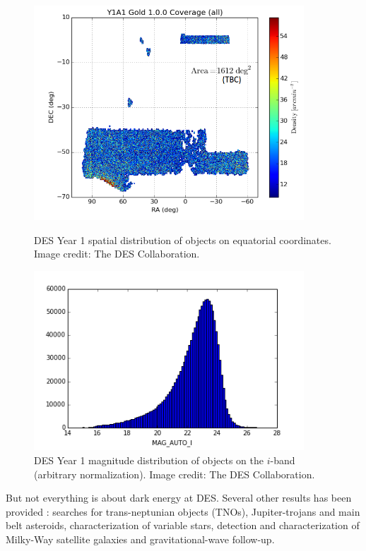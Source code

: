 \begin{figure}
\begin{center}
\includegraphics[width=0.9\textwidth]{./Pictures/des_y1_coverage.png}
\caption{DES Year 1 spatial distribution of objects on equatorial coordinates. Image credit: The DES Collaboration.}
\label{fig:des_y1_coverage}

\includegraphics[width=0.9\textwidth]{./Pictures/des_y1_mag_auto_i.png}
\caption{DES Year 1 magnitude distribution of objects on the $i$-band (arbitrary normalization). Image credit: The DES Collaboration.}
\label{fig:des_y1_mag_auto_i}
\end{center}
\end{figure}
\newline

But not everything is about dark energy at DES. Several other results has been provided \cite{2016MNRAS.460.1270D}: searches for trans-neptunian objects (TNOs), Jupiter-trojans and main belt asteroids, characterization of variable stars, detection and characterization of Milky-Way satellite galaxies and gravitational-wave follow-up.